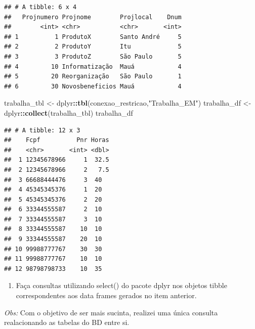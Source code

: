 \documentclass[
]{article}
\newenvironment{Shaded}{\begin{snugshade}}{\end{snugshade}}
\newcommand{\FunctionTok}[1]{\textcolor[rgb]{0.13,0.29,0.53}{\textbf{#1}}}
\newcommand{\NormalTok}[1]{#1}
\newcommand{\OtherTok}[1]{\textcolor[rgb]{0.56,0.35,0.01}{#1}}
\newcommand{\SpecialCharTok}[1]{\textcolor[rgb]{0.81,0.36,0.00}{\textbf{#1}}}
\newcommand{\StringTok}[1]{\textcolor[rgb]{0.31,0.60,0.02}{#1}}
\providecommand{\tightlist}{%
  \setlength{\itemsep}{0pt}\setlength{\parskip}{0pt}}
\begin{document}
\begin{verbatim}
## # A tibble: 6 x 4
##   Projnumero Projnome        Projlocal    Dnum
##        <int> <chr>           <chr>       <int>
## 1          1 ProdutoX        Santo André     5
## 2          2 ProdutoY        Itu             5
## 3          3 ProdutoZ        São Paulo       5
## 4         10 Informatização  Mauá            4
## 5         20 Reorganização   São Paulo       1
## 6         30 Novosbeneficios Mauá            4
\end{verbatim}

\begin{Shaded}
\begin{Highlighting}[]
\NormalTok{trabalha\_tbl }\OtherTok{\textless{}{-}}\NormalTok{ dplyr}\SpecialCharTok{::}\FunctionTok{tbl}\NormalTok{(conexao\_restricao,}\StringTok{"Trabalha\_EM"}\NormalTok{)}
\NormalTok{trabalha\_df }\OtherTok{\textless{}{-}}\NormalTok{ dplyr}\SpecialCharTok{::}\FunctionTok{collect}\NormalTok{(trabalha\_tbl)}
\NormalTok{trabalha\_df}
\end{Highlighting}
\end{Shaded}

\begin{verbatim}
## # A tibble: 12 x 3
##    Fcpf          Pnr Horas
##    <chr>       <int> <dbl>
##  1 12345678966     1  32.5
##  2 12345678966     2   7.5
##  3 66688444476     3  40  
##  4 45345345376     1  20  
##  5 45345345376     2  20  
##  6 33344555587     2  10  
##  7 33344555587     3  10  
##  8 33344555587    10  10  
##  9 33344555587    20  10  
## 10 99988777767    30  30  
## 11 99988777767    10  10  
## 12 98798798733    10  35
\end{verbatim}

\begin{enumerate}
\def\labelenumi{\arabic{enumi}.}
\setcounter{enumi}{3}
\tightlist
\item
  Faça consultas utilizando select() do pacote dplyr nos objetos tibble
  correspondentes aos data frames gerados no item anterior.
\end{enumerate}

\emph{Obs:} Com o objetivo de ser mais sucinta, realizei uma única
consulta realacionando as tabelas do BD entre si.
\end{document}
